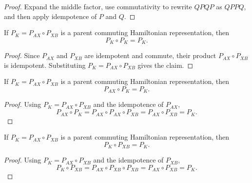 \begin{proof}
    \leanok
    Expand the middle factor, use commutativity to rewrite $QPQP$ as $QPPQ$, and
    then apply idempotence of $P$ and $Q$.
\end{proof}

\begin{theorem}%
    \label{thm:pk_idem}
    \leanok
    If $P_K = P_{AX} \circ P_{XB}$ is a parent commuting Hamiltonian
    representation, then
    \[
        P_K \circ P_K = P_K.
    \]
\end{theorem}

\begin{proof}
    \leanok
    Since $P_{AX}$ and $P_{XB}$ are idempotent and commute, their product
    $P_{AX} \circ P_{XB}$ is idempotent. Substituting
    $P_K = P_{AX} \circ P_{XB}$ gives the claim.
\end{proof}

\begin{theorem}%
    \label{thm:pAX_comp_pK}
    \leanok
    If $P_K = P_{AX} \circ P_{XB}$ is a parent commuting Hamiltonian
    representation, then
    \[
        P_{AX} \circ P_K = P_K.
    \]
\end{theorem}

\begin{proof}
    \leanok
    Using $P_K = P_{AX} \circ P_{XB}$ and the idempotence of $P_{AX}$,
    \[
        P_{AX} \circ P_K
        = P_{AX} \circ P_{AX} \circ P_{XB}
        = P_{AX} \circ P_{XB}
        = P_K.
    \]
\end{proof}

\begin{theorem}%
    \label{thm:pK_comp_pXB}
    \leanok
    If $P_K = P_{AX} \circ P_{XB}$ is a parent commuting Hamiltonian
    representation, then
    \[
        P_K \circ P_{XB} = P_K.
    \]
\end{theorem}

\begin{proof}
    \leanok
    Using $P_K = P_{AX} \circ P_{XB}$ and the idempotence of $P_{XB}$,
    \[
        P_K \circ P_{XB}
        = P_{AX} \circ P_{XB} \circ P_{XB}
        = P_{AX} \circ P_{XB}
        = P_K.
    \]
\end{proof}

